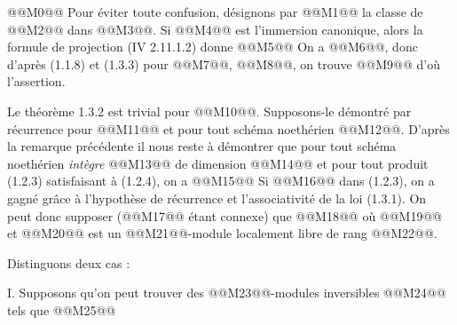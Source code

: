 
@@M0@@
Pour éviter toute confusion, désignons par @@M1@@ la classe de @@M2@@ dans @@M3@@. Si @@M4@@ est l'immersion canonique, alors la formule de projection (IV 2.11.1.2) donne
@@M5@@
On a @@M6@@, donc d'après (1.1.8) et (1.3.3) pour @@M7@@, @@M8@@, on trouve
@@M9@@
d'où l'assertion.

Le théorème 1.3.2 est trivial pour @@M10@@. Supposons-le démontré par récurrence pour @@M11@@ et pour tout schéma noethérien @@M12@@. D'après la remarque précédente il nous reste à démontrer que pour tout schéma noethérien \emph{intègre} @@M13@@ de dimension @@M14@@ et pour tout produit (1.2.3) satisfaisant à (1.2.4), on a
@@M15@@
Si @@M16@@ dans (1.2.3), on a gagné grâce à l'hypothèse de récurrence et l'associativité de la loi (1.3.1). On peut donc supposer (@@M17@@ étant connexe) que
@@M18@@
où @@M19@@ et @@M20@@ est un @@M21@@-module localement libre de rang @@M22@@.

Distinguons deux cas :

I. Supposons qu'on peut trouver des @@M23@@-modules inversibles @@M24@@ tels que
@@M25@@

